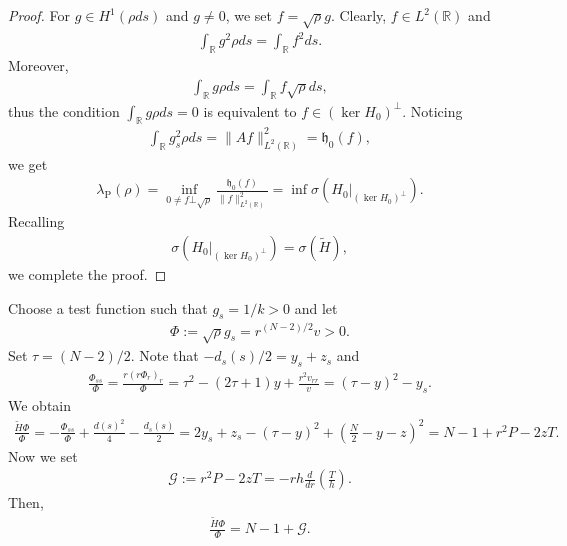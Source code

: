 \documentclass{article}
\theoremstyle{definition} \theoremstyle{remark}
\numberwithin{equation}{section}
\newcommand{\R}{\mathbb{R}}
\newcommand{\la}{\lambda}
\newcommand{\G}{\mathcal{G}}
\begin{document}
	\begin{proof}
		For $g \in H^1(\rho ds)$ and $g \neq 0$, we set $f = \sqrt{\rho}g$. Clearly, $f \in L^2(\R)$ and
		\begin{align*}
			\int_{\R}g^2 \rho ds = \int_{\R}f^2 ds.
		\end{align*}
		Moreover,
		\begin{align*}
			\int_{\R}g \rho ds = \int_{\R}f\sqrt{\rho} ds,
		\end{align*}
		thus the condition $\int_{\R}g \rho ds = 0$ is equivalent to $f \in (\ker H_0)^{\bot}$. Noticing
		\begin{align*}
			\int_{\R}g_s^2\rho ds = \|Af\|_{L^2(\R)}^2 = \mathfrak{h}_0(f),
		\end{align*}
		we get
		\begin{align*}
			\la_{\text{P}}(\rho) = \inf_{0 \neq f \bot \sqrt{\rho}} \frac{\mathfrak{h}_0(f)}{\|f\|_{L^2(\R)}^2} = \inf \sigma\left(H_0|_{(\ker H_0)^{\bot}}\right).
		\end{align*}
		Recalling
		\begin{align*}
		\sigma\left(H_0|_{(\ker H_0)^{\bot}}\right) = \sigma(\widetilde{H}),
	\end{align*}
	we complete the proof.
	\end{proof}

\vskip0.3in


	Choose a test function such that $g_s = 1/k > 0$ and let
	\begin{align} \label{testfunction}
		\Phi := \sqrt{\rho}g_s = r^{(N-2)/2}v > 0.
	\end{align}
	Set $\tau = (N-2)/2$. Note that $-d_s(s)/2 = y_s + z_s$ and
	\begin{align*}
		\frac{\Phi_{ss}}{\Phi} = \frac{r(r\Phi_r)_r}{\Phi} = \tau^2 - (2\tau +1)y + \frac{r^2v_{rr}}{v} = (\tau - y)^2 - y_s.
	\end{align*}
	We obtain
	\begin{align} \label{HPhi}
		\frac{\widetilde{H}\Phi}{\Phi} = -\frac{\Phi_{ss}}{\Phi} + \frac{d(s)^2}{4} - \frac{d_s(s)}{2} = 2y_s + z_s - (\tau - y)^2 + \left(\frac{N}{2} - y - z\right)^2 = N-1 + r^2P - 2zT.
	\end{align}
	Now we set
	\begin{align} \label{def:G}
		\G := r^2P - 2zT = -rh\frac{d}{dr}\left(\frac{T}{h}\right).
	\end{align}
	Then,
	\begin{align*}
		\frac{\widetilde{H}\Phi}{\Phi} = N-1 + \G.
	\end{align*}
\end{document}
